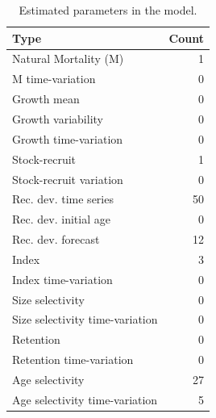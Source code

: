 \documentclass[
  english,
]{article}
\begin{document}
\endgroup

\begingroup
\fontsize{9.0pt}{11.0pt}\selectfont

\begin{longtable}{lr}

\caption{\label{tbl-n-param}Estimated parameters in the model.}

\tabularnewline

\toprule
Type & Count \\ 
\midrule\addlinespace[2.5pt]
Natural Mortality (M) & 1 \\ 
M time-variation & 0 \\ 
Growth mean & 0 \\ 
Growth variability & 0 \\ 
Growth time-variation & 0 \\ 
Stock-recruit & 1 \\ 
Stock-recruit variation & 0 \\ 
Rec. dev. time series & 50 \\ 
Rec. dev. initial age & 0 \\ 
Rec. dev. forecast & 12 \\ 
Index & 3 \\ 
Index time-variation & 0 \\ 
Size selectivity & 0 \\ 
Size selectivity time-variation & 0 \\ 
Retention & 0 \\ 
Retention time-variation & 0 \\ 
Age selectivity & 27 \\ 
Age selectivity time-variation & 5 \\ 
\bottomrule

\end{longtable}

\endgroup

\newpage{}

\begingroup
\fontsize{9.0pt}{11.0pt}\selectfont
\end{document}

